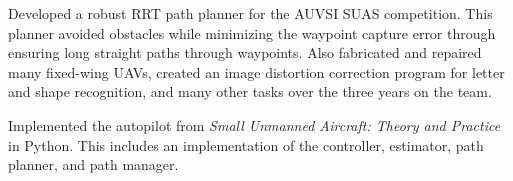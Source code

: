 
\begin{cvparagraph}
Developed a robust RRT path planner for the AUVSI SUAS competition. This planner avoided obstacles while minimizing the waypoint capture error through ensuring long straight paths through waypoints. Also fabricated and repaired many fixed-wing UAVs, created an image distortion correction program for letter and shape recognition, and many other tasks over the three years on the team. 
\end{cvparagraph}


\begin{cvparagraph}
 Implemented the autopilot from \textit{Small Unmanned Aircraft: Theory and Practice} in Python. This includes an implementation of the controller, estimator, path planner, and path manager.
\end{cvparagraph}



%
%
